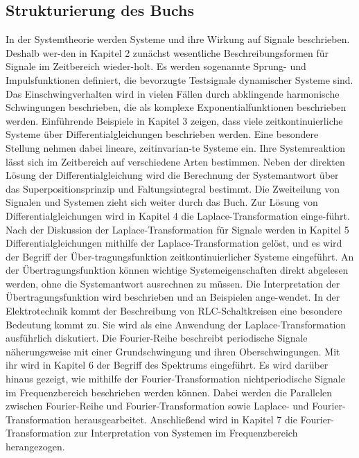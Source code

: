 \clearpage

\subsection{Strukturierung des Buchs }

In der Systemtheorie werden Systeme und ihre Wirkung auf Signale beschrieben. Deshalb wer-den in Kapitel 2 zunächst wesentliche Beschreibungsformen für Signale im Zeitbereich wieder-holt. Es werden sogenannte Sprung- und Impulsfunktionen definiert, die bevorzugte Testsignale dynamischer Systeme sind. Das Einschwingverhalten wird in vielen Fällen durch abklingende harmonische Schwingungen beschrieben, die als komplexe Exponentialfunktionen beschrieben werden.\newline
Einführende Beispiele in Kapitel 3 zeigen, dass viele zeitkontinuierliche Systeme über Differentialgleichungen beschrieben werden. Eine besondere Stellung nehmen dabei lineare, zeitinvarian-te Systeme ein. Ihre Systemreaktion lässt sich im Zeitbereich auf verschiedene Arten bestimmen. Neben der direkten Lösung der Differentialgleichung wird die Berechnung der Systemantwort über das Superpositionsprinzip und Faltungsintegral bestimmt. Die Zweiteilung von Signalen und Systemen zieht sich weiter durch das Buch. \newline
Zur Lösung von Differentialgleichungen wird in Kapitel 4 die Laplace-Transformation einge-führt. Nach der Diskussion der Laplace-Transformation für Signale werden in Kapitel 5 Differentialgleichungen mithilfe der Laplace-Transformation gelöst, und es wird der Begriff der Über-tragungsfunktion zeitkontinuierlicher Systeme eingeführt. An der Übertragungsfunktion können wichtige Systemeigenschaften direkt abgelesen werden, ohne die Systemantwort ausrechnen zu müssen. Die Interpretation der Übertragungsfunktion wird beschrieben und an Beispielen ange-wendet. In der Elektrotechnik kommt der Beschreibung von RLC-Schaltkreisen eine besondere Bedeutung kommt zu. Sie wird als eine Anwendung der Laplace-Transformation ausführlich diskutiert.\newline
Die Fourier-Reihe beschreibt periodische Signale näherungsweise mit einer Grundschwingung und ihren Oberschwingungen. Mit ihr wird in Kapitel 6 der Begriff des Spektrums eingeführt. Es wird darüber hinaus gezeigt, wie mithilfe der Fourier-Transformation nichtperiodische Signale im Frequenzbereich beschrieben werden können. Dabei werden die Parallelen zwischen Fourier-Reihe und Fourier-Transformation sowie Laplace- und Fourier-Transformation herausgearbeitet. Anschließend wird in Kapitel 7 die Fourier-Transformation zur Interpretation von Systemen im Frequenzbereich herangezogen. \newline
